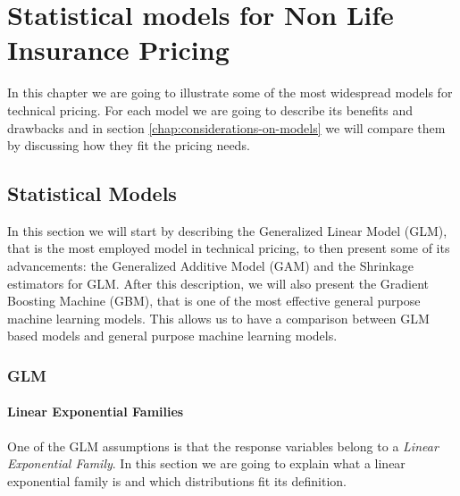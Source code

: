 \documentclass[a4paper, nobind]{templates/ociamthesis}
\theoremstyle{definition}
\theoremstyle{definition}
\theoremstyle{definition}
\theoremstyle{remark}
\begin{document}
\hypertarget{chap:models}{%
\chapter{\texorpdfstring{\textbf{Statistical models for Non Life Insurance Pricing}}{Statistical models for Non Life Insurance Pricing}}\label{chap:models}}

\minitoc  


In this chapter we are going to illustrate some of the most widespread models for technical pricing. For each model we are going to describe its benefits and drawbacks and in section \ref{chap:considerations-on-models} we will compare them by discussing how they fit the pricing needs.

\hypertarget{statistical-models}{%
\section{Statistical Models}\label{statistical-models}}

In this section we will start by describing the Generalized Linear Model (GLM), that is the most employed model in technical pricing, to then present some of its advancements: the Generalized Additive Model (GAM) and the Shrinkage estimators for GLM. After this description, we will also present the Gradient Boosting Machine (GBM), that is one of the most effective general purpose machine learning models. This allows us to have a comparison between GLM based models and general purpose machine learning models.

\hypertarget{chap:glm}{%
\subsection{GLM}\label{chap:glm}}

\hypertarget{chap:linear-exp-families}{%
\subsubsection{Linear Exponential Families}\label{chap:linear-exp-families}}

One of the GLM assumptions is that the response variables belong to a \emph{Linear Exponential Family}. In this section we are going to explain what a linear exponential family is and which distributions fit its definition.
\end{document}
